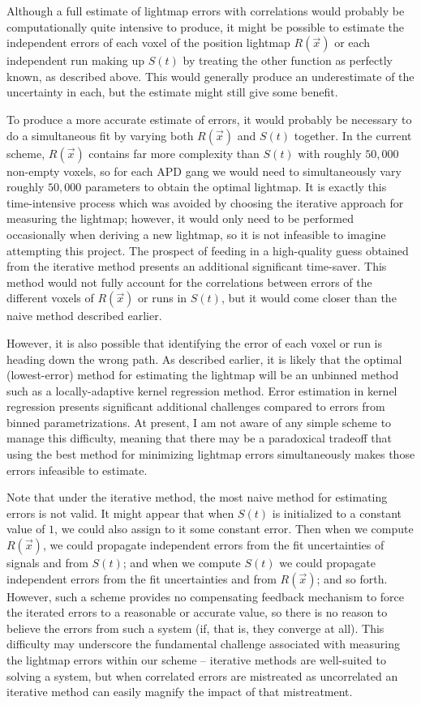 Although a full estimate of lightmap errors with correlations would probably be computationally quite intensive to produce, it might be possible to estimate the independent errors of each voxel of the position lightmap $R(\vec{x})$ or each independent run making up $S(t)$ by treating the other function as perfectly known, as described above.  This would generally produce an underestimate of the uncertainty in each, but the estimate might still give some benefit.

To produce a more accurate estimate of errors, it would probably be necessary to do a simultaneous fit by varying both $R(\vec{x})$ and $S(t)$ together.  In the current scheme, $R(\vec{x})$ contains far more complexity than $S(t)$ with roughly $50,000$ non-empty voxels, so for each APD gang we would need to simultaneously vary roughly $50,000$ parameters to obtain the optimal lightmap.  It is exactly this time-intensive process which was avoided by choosing the iterative approach for measuring the lightmap; however, it would only need to be performed occasionally when deriving a new lightmap, so it is not infeasible to imagine attempting this project.  The prospect of feeding in a high-quality guess obtained from the iterative method presents an additional significant time-saver.  This method would not fully account for the correlations between errors of the different voxels of $R(\vec{x})$ or runs in $S(t)$, but it would come closer than the naive method described earlier.

However, it is also possible that identifying the error of each voxel or run is heading down the wrong path.  As described earlier, it is likely that the optimal (lowest-error) method for estimating the lightmap will be an unbinned method such as a locally-adaptive kernel regression method.  Error estimation in kernel regression presents significant additional challenges compared to errors from binned parametrizations.  At present, I am not aware of any simple scheme to manage this difficulty, meaning that there may be a paradoxical tradeoff that using the best method for minimizing lightmap errors simultaneously makes those errors infeasible to estimate.

Note that under the iterative method, the most naive method for estimating errors is not valid.  It might appear that when $S(t)$ is initialized to a constant value of $1$, we could also assign to it some constant error.  Then when we compute $R(\vec{x})$, we could propagate independent errors from the fit uncertainties of signals and from $S(t)$; and when we compute $S(t)$ we could propagate independent errors from the fit uncertainties and from $R(\vec{x})$; and so forth.  However, such a scheme provides no compensating feedback mechanism to force the iterated errors to a reasonable or accurate value, so there is no reason to believe the errors from such a system (if, that is, they converge at all).  This difficulty may underscore the fundamental challenge associated with measuring the lightmap errors within our scheme -- iterative methods are well-suited to solving a system, but when correlated errors are mistreated as uncorrelated an iterative method can easily magnify the impact of that mistreatment.

